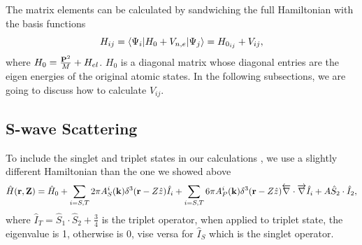 \documentclass[british,english]{article}
\numberwithin{equation}{section}
\numberwithin{figure}{section}
\begin{document}
The matrix elements can be calculated by sandwiching the full Hamiltonian with the basis functions
\begin{equation}
H_{ij}=\braket{\Psi_i|H_0+V_{n,e}|\Psi_j}=H_{0_{ij}}+V_{ij},
\end{equation}
where $H_0 =\frac{{\bf P}^{2}}{M}+H_{el}$. $H_0$ is a diagonal matrix whose diagonal entries are the eigen energies of the original atomic states. In the following subsections, we are going to discuss how to calculate $V_{ij}$.
\subsection{S-wave Scattering}
To include the singlet and triplet states in our calculations \cite{}, we use a slightly different Hamiltonian than the one we showed above
\begin{equation}
\hat H({\bf r, Z})=\hat H_0+\sum_{i=S,T}2\pi A^i_S({\bf k})\delta^3({\bf r}-Z\hat z)\hat I_i+\sum_{i=S,T}6\pi A_P^i({\bf k})\delta^3({\bf r}-Z\hat z)\overleftarrow{\nabla}\cdot\overrightarrow\nabla\hat I_i+A\hat S_2\cdot \hat I_2,
\end{equation}
 where $\hat I_T=\hat S_1\cdot \hat S_2+\frac 34$ is the triplet operator, when applied to triplet state, the eigenvalue is 1, otherwise is 0, vise versa for $\hat I_S$ which is the singlet operator.
\end{document}
